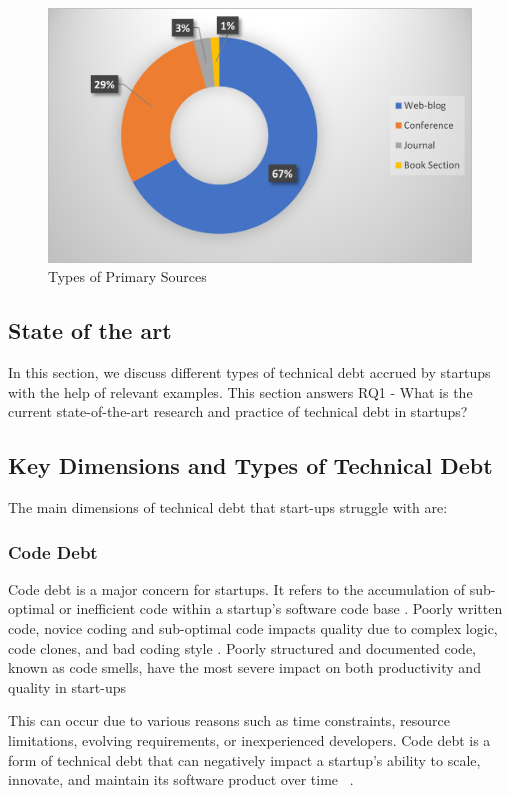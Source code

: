 \begin{figure}
  \includegraphics[width=\textwidth]{TypeSources.jpg}
  \caption{Types of Primary Sources}
 \label{fig:Sources}
\end{figure}

\subsection{State of the art}
In this section, we discuss different types of technical debt accrued by startups with the help of relevant examples. This section answers RQ1 - What is the current state-of-the-art research and practice of technical debt in startups?

\subsection{Key Dimensions and Types of Technical Debt}
The main dimensions of technical debt that start-ups struggle with are:

\subsubsection{Code Debt} 
Code debt is a major concern for startups. It refers to the accumulation of sub-optimal or inefficient code within a startup's software code base . Poorly written code, novice coding and sub-optimal code impacts quality due to complex logic, code clones, and bad coding style . Poorly structured and documented code, known as code smells, have the most severe impact on both productivity and quality in start-ups ~\cite{Klotins2018/3183519.3183539}

This can occur due to various reasons such as time constraints, resource limitations, evolving requirements, or inexperienced developers. Code debt is a form of technical debt that can negatively impact a startup's ability to scale, innovate, and maintain its software product over time ~\cite{FowlerBottlenecks, Qualityv77:online}.

